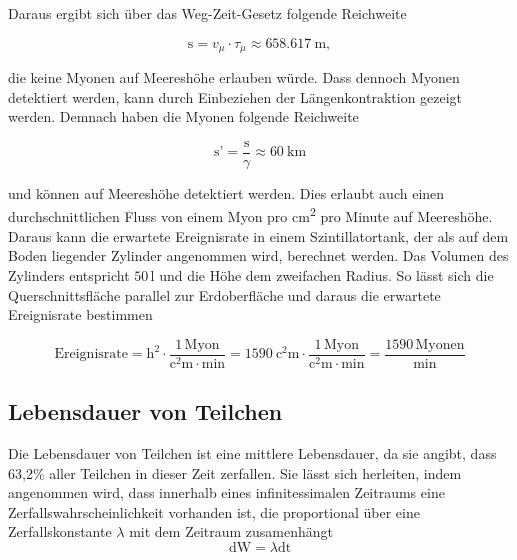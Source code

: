         Daraus ergibt sich über das Weg-Zeit-Gesetz folgende Reichweite

        \begin{equation*}
            \text{s} = v_{\mu} \cdot \tau_{\mu} \approx \SI{658.617}{\metre},
        \end{equation*}

        die keine Myonen auf Meereshöhe erlauben würde. Dass dennoch Myonen detektiert werden, kann durch Einbeziehen der Längenkontraktion gezeigt werden. Demnach haben die Myonen folgende Reichweite

        \begin{equation*}
            \text{s’} = \frac{\text{s}}{\gamma} \approx \SI{60}{\kilo\metre}
        \end{equation*}

        und können auf Meereshöhe detektiert werden. Dies erlaubt auch einen durchschnittlichen Fluss von einem Myon pro \si{\square\centi\metre} pro Minute auf Meereshöhe. Daraus kann die erwartete 
        Ereignisrate in einem Szintillatortank, der als auf dem Boden liegender Zylinder angenommen wird, berechnet werden. Das Volumen des Zylinders entspricht $50\,$l und die Höhe dem zweifachen Radius. So
        lässt sich die Querschnittsfläche parallel zur Erdoberfläche und daraus die erwartete Ereignisrate bestimmen
        
        \begin{equation*}
            \text{Ereignisrate} = \text{h}^2 \cdot \frac{1 \, \text{Myon}}{\si{\square\centi\metre} \cdot \si{\minute}} = \SI{1590}{\square\centi\metre} \cdot \frac{1 \, \text{Myon}}{\si{\square\centi\metre} \cdot \si{\minute}} = \frac{1590 \, \text{Myonen}}{\si{\minute}}
        \end{equation*}

    \subsection{Lebensdauer von Teilchen}
        Die Lebensdauer von Teilchen ist eine mittlere Lebensdauer, da sie angibt, dass 63,2\% aller Teilchen in dieser Zeit zerfallen. Sie lässt sich herleiten, indem angenommen wird, dass innerhalb
        eines infinitessimalen Zeitraums eine Zerfallswahrscheinlichkeit vorhanden ist, die proportional über eine Zerfallskonstante $\lambda$ mit dem Zeitraum zusamenhängt
        \begin{equation}
            \text{dW} = \lambda \text{dt}
            \label{eqn:dW}
        \end{equation}

